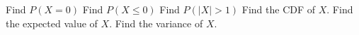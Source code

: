 \documentclass[addpoints]{examsetup}
\begin{document}
\begin{questions}
      \begin{subparts}
            \subpart[2] Find $P(X = 0)$ \vspace{2.5cm}
            \subpart[2] Find $P(X \le 0)$ \vspace{2.5cm}
            \subpart[2] Find $P(\vert{X}\vert > 1)$ \vspace{2.5cm}
            \subpart[3] Find the CDF of $X$.\vspace{2.5cm}
            \subpart[3] Find the expected value of $X$.\vspace{2.5cm}
            \subpart[3] Find the variance of $X$.\vspace{2.5cm}
      \end{subparts}
\pagebreak      
%       
%       
%       
% 
% 

\end{questions}
\end{document}
